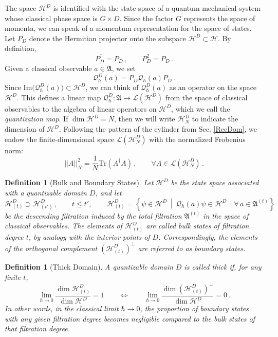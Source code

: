\documentclass[12pt,a4paper]{article}
\numberwithin{equation}{section}
\theoremstyle{theorem}
\newtheorem{definition}[equation]{Definition}
\theoremstyle{remark}
\newcommand{\hh}{\mathcal{H}}
\newcommand{\fa}{\mathfrak{A}}
\newcommand{\qq}{\mathcal{Q}_{\hbar}}
\begin{document}
The space $\hh^D$ is identified with the state space of a quantum-mechanical system whose classical phase space is  $G\times D$. Since the factor $G$ represents the space of momenta, we can speak of a momentum representation for the space of states.  Let $P_D$ denote the Hermitian projector onto the  subspace $\hh^D\subset \hh$. By definition,
\begin{equation}
    P_D^\dagger=P_D\,,\qquad P_D^2=P_D\,.
\end{equation}
Given a classical observable $a\in \fa$, we set
\begin{equation}
    \qq^D(a)=P_D\qq(a)P_D\,.
\end{equation}
Since $\mathrm{Im} \big(\qq^D(a)\big)\subset \hh^D$, we can think of $\qq^D(a)$ as an operator on the space $\hh^D$. 
This defines a linear map $\qq^D:\fa\rightarrow \mathscr{L}(\hh^D)$ from the space of classical observables to the algebra of linear operators on $\hh^D$, which we call the {\it quantization map}. If $\dim \hh^D=N$, then we will write $\hh^D_N$ to indicate the dimension of $\hh^D$.   Following the pattern of the cylinder from Sec. \ref{RecDom}, we endow the finite-dimensional space  $\mathscr{L}(\hh^D_N)$  with the normalized Frobenius norm:  
\begin{equation}
    ||A||_N^2=\frac1N{\mathrm{Tr}}(A^\dagger A)\,,\qquad \forall A\in \mathscr{L}(\hh^D_N)\,.
\end{equation}



\begin{definition}[Bulk and Boundary States]
Let \(\mathcal{H}^D\) be the state space associated with a quantizable domain \(D\), and let
$$
\hh^D_{(t)}\supset \hh_{(t')}^D\,,\qquad t\leq t',\qquad \mathcal{H}^D_{(t)} = \left\{ \psi \in \hh^D \ \middle|\ \qq(a)\psi \in \mathcal{H}^D \quad \forall\, a \in \fa^{(t)} \right\}
$$
be the descending filtration induced by the total filtration \(\fa^{(t)}\) in the space of classical observables.
The elements of \(\mathcal{H}^D_{(t)}\) are called {bulk states of filtration degree \(t\)}, by analogy with the interior points of \(D\).  
Correspondingly, the elements of the orthogonal complement $(\mathcal{H}^D_{(t)})^\perp$ are referred to as {boundary states}.
\end{definition}






\begin{definition}[Thick Domain]
A quantizable domain \(D\) is called {thick} if, for any finite \(t\),
\[
\lim_{\hbar \to 0} \frac{\dim \mathcal{H}^D_{(t)}}{\dim \mathcal{H}^D} = 1\qquad \Longleftrightarrow\qquad \lim_{\hbar \to 0} \frac{\dim (\mathcal{H}^D_{(t)})^\perp}{\dim \mathcal{H}^D} = 0\,.
\]
In other words, in the classical limit \(\hbar \to 0\), the proportion of boundary states with any given filtration degree becomes negligible compared to the bulk states of that filtration degree.
\end{definition}
\end{document}
